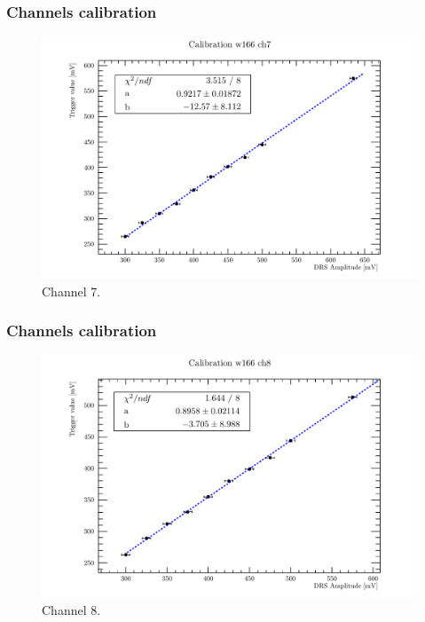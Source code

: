 \documentclass[9pt]{beamer}
\begin{document}

\begin{frame} [fragile]
\small
	\frametitle{Channels calibration}
    		\begin{figure}
		 \centering
			\includegraphics[scale=0.5]{figures/ch7.pdf}
			\caption{Channel 7.}
		\end{figure}  
\end{frame}


\begin{frame} [fragile]
\small
	\frametitle{Channels calibration}
    		\begin{figure}
		 \centering
			\includegraphics[scale=0.5]{figures/ch8.pdf}
			\caption{Channel 8.}
		\end{figure}  
\end{frame}
\end{document}
